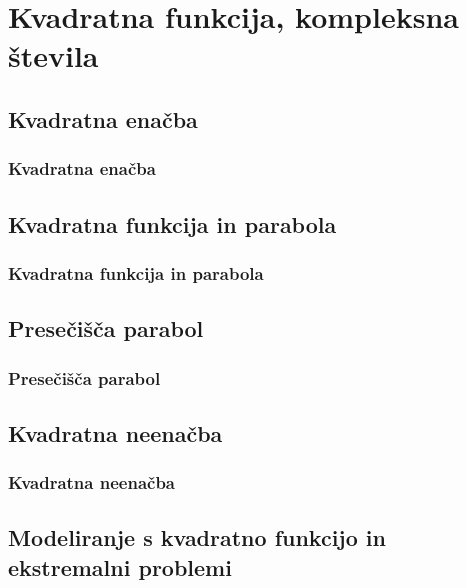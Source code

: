 \section{Kvadratna funkcija, kompleksna števila}

\begin{frame}
    \sectionpage
\end{frame}

\begin{frame}
\end{frame}

    \subsection{Kvadratna enačba}

        \begin{frame}
            \frametitle{Kvadratna enačba}
        \end{frame}

    \subsection{Kvadratna funkcija in parabola}

        \begin{frame}
            \frametitle{Kvadratna funkcija in parabola}
        \end{frame}

    \subsection{Presečišča parabol}

        \begin{frame}
            \frametitle{Presečišča parabol}
        \end{frame}

    \subsection{Kvadratna neenačba}

        \begin{frame}
            \frametitle{Kvadratna neenačba}
        \end{frame}

    \subsection{Modeliranje s kvadratno funkcijo in ekstremalni problemi}

